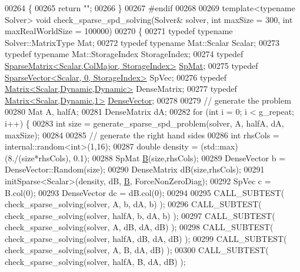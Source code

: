 \begin{DoxyCode}
00264 \{
00265   \textcolor{keywordflow}{return} \textcolor{stringliteral}{""};
00266 \}
00267 \textcolor{preprocessor}{#endif}
00268 
00269 \textcolor{keyword}{template}<\textcolor{keyword}{typename} Solver> \textcolor{keywordtype}{void} check\_sparse\_spd\_solving(Solver& solver, \textcolor{keywordtype}{int} maxSize = 300, \textcolor{keywordtype}{int} 
      maxRealWorldSize = 100000)
00270 \{
00271   \textcolor{keyword}{typedef} \textcolor{keyword}{typename} Solver::MatrixType Mat;
00272   \textcolor{keyword}{typedef} \textcolor{keyword}{typename} Mat::Scalar Scalar;
00273   \textcolor{keyword}{typedef} \textcolor{keyword}{typename} Mat::StorageIndex StorageIndex;
00274   \textcolor{keyword}{typedef} \hyperlink{group___sparse_core___module}{SparseMatrix<Scalar,ColMajor, StorageIndex>} 
      \hyperlink{group___sparse_core___module}{SpMat};
00275   \textcolor{keyword}{typedef} \hyperlink{group___sparse_core___module_class_eigen_1_1_sparse_vector}{SparseVector<Scalar, 0, StorageIndex>} SpVec;
00276   \textcolor{keyword}{typedef} \hyperlink{group___core___module}{Matrix<Scalar,Dynamic,Dynamic>} DenseMatrix;
00277   \textcolor{keyword}{typedef} \hyperlink{group___core___module}{Matrix<Scalar,Dynamic,1>} \hyperlink{group___core___module}{DenseVector};
00278 
00279   \textcolor{comment}{// generate the problem}
00280   Mat A, halfA;
00281   DenseMatrix dA;
00282   \textcolor{keywordflow}{for} (\textcolor{keywordtype}{int} i = 0; i < g\_repeat; i++) \{
00283     \textcolor{keywordtype}{int} size = generate\_sparse\_spd\_problem(solver, A, halfA, dA, maxSize);
00284 
00285     \textcolor{comment}{// generate the right hand sides}
00286     \textcolor{keywordtype}{int} rhsCols = internal::random<int>(1,16);
00287     \textcolor{keywordtype}{double} density = (std::max)(8./(size*rhsCols), 0.1);
00288     SpMat \hyperlink{group___core___module_class_eigen_1_1_matrix}{B}(size,rhsCols);
00289     DenseVector b = DenseVector::Random(size);
00290     DenseMatrix dB(size,rhsCols);
00291     initSparse<Scalar>(density, dB, \hyperlink{group___core___module_class_eigen_1_1_matrix}{B}, ForceNonZeroDiag);
00292     SpVec c = B.col(0);
00293     DenseVector dc = dB.col(0);
00294   
00295     CALL\_SUBTEST( check\_sparse\_solving(solver, A,     b,  dA, b)  );
00296     CALL\_SUBTEST( check\_sparse\_solving(solver, halfA, b,  dA, b)  );
00297     CALL\_SUBTEST( check\_sparse\_solving(solver, A,     dB, dA, dB) );
00298     CALL\_SUBTEST( check\_sparse\_solving(solver, halfA, dB, dA, dB) );
00299     CALL\_SUBTEST( check\_sparse\_solving(solver, A,     B,  dA, dB) );
00300     CALL\_SUBTEST( check\_sparse\_solving(solver, halfA, B,  dA, dB) );

\end{DoxyCode}
